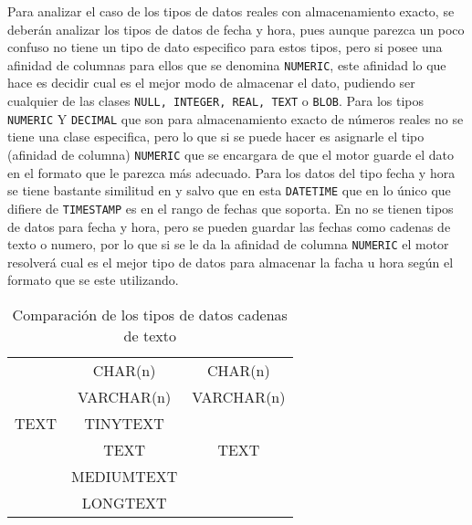 Para analizar el caso de los tipos de datos reales con almacenamiento exacto, se deberán analizar los tipos de datos de fecha y hora, pues aunque parezca un poco confuso \s no tiene un tipo de dato especifico para estos tipos, pero si posee una afinidad de columnas para ellos que se denomina \verb=NUMERIC=, este afinidad lo que hace es decidir cual es el mejor modo de almacenar el dato, pudiendo ser cualquier de las clases \verb=NULL, INTEGER, REAL, TEXT= o \verb=BLOB=. Para los tipos \verb=NUMERIC= Y \verb=DECIMAL= que son para almacenamiento exacto de números reales no se tiene una clase especifica, pero lo que si se puede hacer es asignarle el tipo (afinidad de columna) \verb=NUMERIC= que se encargara de que el motor guarde el dato en el formato que le parezca más adecuado. Para los datos del tipo fecha y hora se tiene bastante similitud  en \m y \p salvo que en \m esta \verb=DATETIME= que en lo único que difiere de \verb=TIMESTAMP= es en el rango de fechas que soporta. En \s no se tienen tipos de datos para fecha y hora, pero se pueden guardar las fechas como cadenas de texto o numero, por lo que si se le da la afinidad de columna \verb=NUMERIC= el motor resolverá cual es el mejor tipo de datos para almacenar la facha u hora según el formato que se este utilizando.   
%
\begin{table}[h]
\begin{center}
\begin{tabular}{|c|c|c|}
\hline \s & \m & \p \\ 
\hline  & CHAR(n) & CHAR(n) \\  
    & VARCHAR(n) & VARCHAR(n) \\ 
  TEXT   & TINYTEXT &  \\  
    & TEXT & TEXT \\
    & MEDIUMTEXT &  \\  
    & LONGTEXT &  \\  
\hline 
\end{tabular} 
\end{center}
\caption{Comparación de los tipos de datos cadenas de texto}
\end{table}
%

